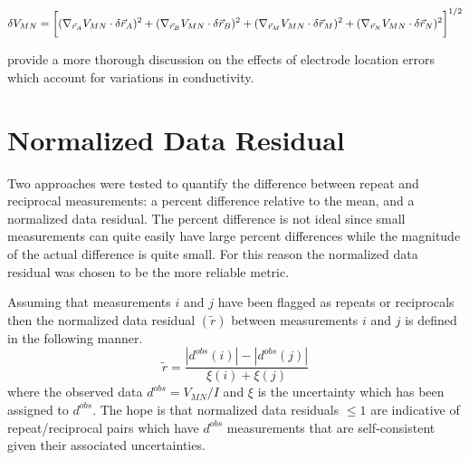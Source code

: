 \documentclass[final,authoryear,5p,times,twocolumn]{elsarticle}
\begin{document}
\begin{equation}
 \delta V_{MN} = \bigg[ (\nabla_{\vec{r}_{A}} V_{MN} \cdot \delta \vec{r}_{A} )^2+ (\nabla_{\vec{r}_{B}} V_{MN} \cdot \delta \vec{r}_{B})^2 + \\
 (\nabla_{\vec{r}_{M}} V_{MN} \cdot \delta \vec{r}_{M})^2 + (\nabla_{\vec{r}_{N}} V_{MN} \cdot \delta \vec{r}_{N})^2 \bigg]^{1/2}
\end{equation}

\cite{Oldenborger2005} provide a more thorough discussion on the effects of electrode location errors which account for variations in conductivity.

\section{Normalized Data Residual}
\label{Appen:NDR}
Two approaches were tested to quantify the difference between repeat and reciprocal measurements: a percent difference relative to the mean, and a normalized data residual. The percent difference is not ideal since small measurements can quite easily have large percent differences while the magnitude of the actual difference is quite small. For this reason the normalized data residual was chosen to be the more reliable metric.

Assuming that measurements $i$ and $j$ have been flagged as repeats or reciprocals then the normalized data residual $\left(\tilde{r}\right)$ between measurements $i$ and $j$ is defined in the following manner.
\begin{equation}
\label{eq:NormalizedDataResid}
\tilde{r}  = \frac{\left| d^{obs}(i) \right| - \left| d^{obs}(j) \right|}{\xi(i) + \xi(j)}
\end{equation}
where the observed data $d^{obs} = V_{MN}/I$ and $\xi$ is the uncertainty which has been assigned to $d^{obs}$. The hope is that normalized data residuals $\leq 1$ are indicative of repeat/reciprocal pairs which have $d^{obs}$ measurements that are self-consistent given their associated uncertainties.




\end{document}
